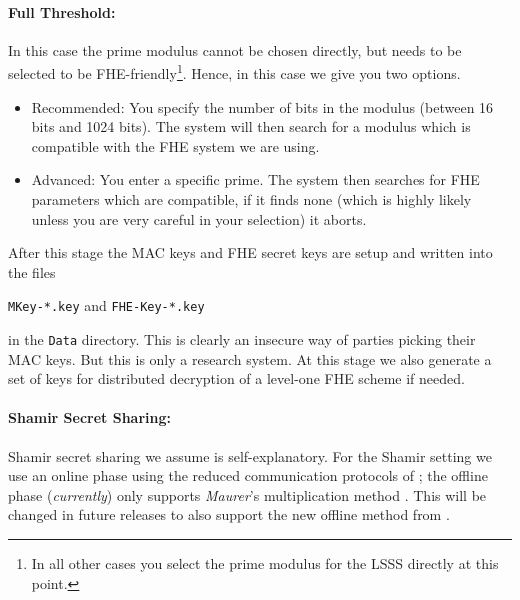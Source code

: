 \paragraph{Full Threshold:}
In this case the prime modulus cannot be chosen directly, but
needs to be selected to be FHE-friendly\footnote{In all other cases you select the prime modulus for the LSSS directly at this point.}.
Hence, in this case we give you two options.
\begin{itemize}
\item Recommended: You specify the number of bits in the modulus
(between 16 bits and 1024 bits).  The system will then
search for a modulus which is compatible with the FHE system we are
using.
\item Advanced: You enter a specific prime. The system then searches
for FHE parameters which are compatible, if it finds none (which is highly
likely unless you are very careful in your selection) it aborts.
\end{itemize}
After this stage the MAC keys and FHE secret keys are setup and written into the
files
\begin{center}
\verb+MKey-*.key+ and \verb+FHE-Key-*.key+
\end{center}
in the \verb+Data+ directory.
This is clearly an insecure way of parties picking their MAC keys. But this is only a
research system.
At this stage we also generate a set of keys
for distributed decryption of a level-one FHE scheme if needed.
\iffalse XXXX
For the case of fake offline we assume these keys are on {\em each} computer,
but using fake offline is only for test purposes in any case.
\fi

\paragraph{Shamir Secret Sharing:}
Shamir secret sharing we assume is self-explanatory.
For the Shamir setting we use an online phase using the reduced communication
protocols of \cite{KRSW};
the offline phase ({\em currently}) only supports {\em Maurer}'s multiplication method
\cite{Maurer}.
This will be changed in future releases to also support the new offline method from
\cite{SW18}.


